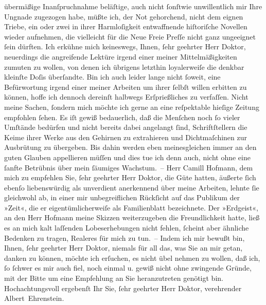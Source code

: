 \begin{ledgroupsized}[t]{13cm}
               übermäßige Inanſpruchnahme beläſtige, auch nicht {\pb}ſonſtwie unwillentlich mir Ihre Ungnade
               zugezogen habe, müßte ich, der Not gehorchend, nicht dem eignen Triebe, ein oder zwei
               in ihrer Harmloſigkeit entwaffnende hiſtoriſche Novellen wieder aufnehmen, die
               vielleicht für die Neue Freie Preſſe nicht ganz
               ungeeignet ſein dürften. Ich erkühne mich keineswegs, Ihnen, ſehr geehrter Herr
               Doktor, neuerdings die angreifende Lektüre irgend einer meiner Mittelmäßigkeiten
               zumuten zu wollen, von denen ich übrigens letzthin loyalerweiſe die denkbar kleinſte
               Doſis überſandte. Bin ich auch leider lange nicht ſoweit, eine Befürwortung irgend
               einer meiner Arbeiten um ihrer ſelbſt willen erbitten zu können, hoffe ich dennoch
               dereinſt halbwegs Erſprießliches zu verfaſſen. Nicht meine Sachen, {\pb}ſondern mich möchte ich gerne an eine
               reſpektable hieſige Zeitung empfohlen ſehen. Es iſt gewiß bedauerlich, daß die
               Menſchen noch ſo vieler Umſtände bedürfen und nicht bereits dabei angelangt ſind,
               Schriftſtellern die Keime ihrer Werke aus den Gehirnen zu extrahieren und
               Dichtmaſchinen zur Ausbrütung zu übergeben. Bis dahin werden eben meinesgleichen
               immer an den guten Glauben appellieren müſſen und dies tue ich denn auch, nicht ohne
               eine ſanfte Betrübnis über mein ſäumiges Wachstum. – Herr Camill Hofmann, dem mich zu empfehlen Sie, ſehr geehrter Herr
               Doktor, die Güte hatten, äußerte ſich ebenſo liebenswürdig als unverdient anerkennend
               über meine Arbeiten, lehnte ſie gleichwohl ab, in einer {\pb}mir unbegreiflichen Rückſicht auf das
               Publikum der »Zeit«, die er eigentümlicherweiſe
               als Familienblatt bezeichnete. Der »Erdgeist«, an
               den Herr Hofmann meine Skizzen weiterzugeben
               die Freundlichkeit hatte, ließ es an mich kalt laſſenden Lobeserhebungen nicht
               fehlen, ſcheint aber ähnliche Bedenken zu tragen, Realeres für mich zu tun. – Indem
               ich mir bewußt bin, Ihnen, ſehr geehrter Herr Doktor, niemals für all das, was Sie an
               mir getan, danken zu können, möchte ich erſuchen, es nicht übel nehmen zu wollen, daß
               ich, ſo ſchwer es mir auch fiel, noch einmal u. gewiß nicht ohne zwingende Gründe,
               mit der Bitte um eine Empfehlung an Sie heranzutreten genötigt bin. Hochachtungsvoll
               ergebenſt Ihr Sie, ſehr geehrter Herr Doktor, verehrender\pend
           \pstart \spacefill\mbox{Albert Ehrenstein.}\pend{}
         

\end{ledgroupsized}
